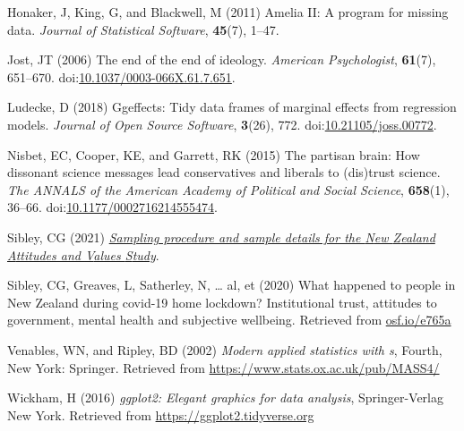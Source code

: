 \documentclass[
  single column]{article}
\newlength{\cslhangindent}
\newenvironment{CSLReferences}[2] %
 {\begin{list}{}{%
  \setlength{\itemindent}{0pt}
  \setlength{\leftmargin}{0pt}
  \setlength{\parsep}{0pt}
  \ifodd #1
   \setlength{\leftmargin}{\cslhangindent}
   \setlength{\itemindent}{-1\cslhangindent}
  \fi
  \setlength{\itemsep}{#2\baselineskip}}}
 {\end{list}}
\begin{document}
\begin{CSLReferences}{1}{0}
Honaker, J, King, G, and Blackwell, M (2011) {Amelia II}: A program for
missing data. \emph{Journal of Statistical Software}, \textbf{45}(7),
1--47.

Jost, JT (2006) The end of the end of ideology. \emph{American
Psychologist}, \textbf{61}(7), 651--670.
doi:\href{https://doi.org/10.1037/0003-066X.61.7.651}{10.1037/0003-066X.61.7.651}.

Ludecke, D (2018) Ggeffects: Tidy data frames of marginal effects from
regression models. \emph{Journal of Open Source Software},
\textbf{3}(26), 772.
doi:\href{https://doi.org/10.21105/joss.00772}{10.21105/joss.00772}.

Nisbet, EC, Cooper, KE, and Garrett, RK (2015) The partisan brain: How
dissonant science messages lead conservatives and liberals to (dis)trust
science. \emph{The ANNALS of the American Academy of Political and
Social Science}, \textbf{658}(1), 36--66.
doi:\href{https://doi.org/10.1177/0002716214555474}{10.1177/0002716214555474}.

Sibley, CG (2021)
\emph{\href{https://doi.org/10.31234/osf.io/wgqvy}{Sampling procedure
and sample details for the {N}ew {Z}ealand {A}ttitudes and {V}alues
{S}tudy}}.

Sibley, CG, Greaves, L, Satherley, N, \ldots{} al, et (2020) What
happened to people in {N}ew {Z}ealand during covid-19 home lockdown?
Institutional trust, attitudes to government, mental health and
subjective wellbeing. Retrieved from
\href{https://osf.io/e765a}{osf.io/e765a}

Venables, WN, and Ripley, BD (2002) \emph{Modern applied statistics with
s}, Fourth, New York: Springer. Retrieved from
\url{https://www.stats.ox.ac.uk/pub/MASS4/}

Wickham, H (2016) \emph{ggplot2: Elegant graphics for data analysis},
Springer-Verlag New York. Retrieved from
\url{https://ggplot2.tidyverse.org}

\end{CSLReferences}
\end{document}
